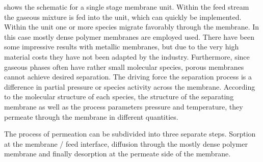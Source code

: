 %	


 shows the schematic for a single stage membrane unit. Within the feed stream
the gaseous mixture is fed into the unit, which can quickly be implemented. Within the unit one or more
species migrate favorably through the membrane. In this case mostly dense polymer membranes are
employed used. There have been some impressive results with metallic membranes, but due to
the very high material costs they have not been adapted by the industry. Furthermore, since gaseous
phases often have rather small molecular species, porous membranes cannot achieve desired separation.
The driving force the separation process is a difference in partial pressure or species activity across the
membrane. According to the molecular structure of each species, the structure of the separating membrane
as well as the process parameters pressure and temperature, they permeate through the membrane in
different quantities.

The process of permeation can be subdivided into three separate steps. Sorption at the membrane /
feed interface, diffusion through the mostly dense polymer membrane and finally desorption at the
permeate side of the membrane.
